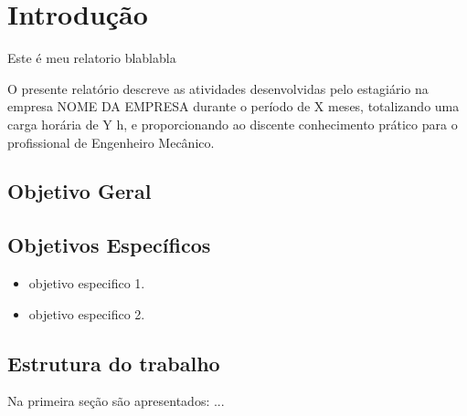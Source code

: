 \chapter{Introdução}\label{ch:introducao}

Este é meu relatorio blablabla 

O presente relatório descreve as atividades desenvolvidas pelo estagiário na empresa 
NOME DA EMPRESA durante o período de X meses, totalizando uma carga horária de Y h, 
e proporcionando ao discente conhecimento prático para o profissional de Engenheiro Mecânico.

\section{Objetivo Geral}\label{sec:objetivogeral}


\section{Objetivos Específicos}\label{sec:objetivoesp}

	\begin{itemize}
		\item objetivo especifico 1.
		\item objetivo especifico 2.
	\end{itemize}

\section{Estrutura do trabalho}\label{sec:estruturatrab}

Na primeira seção são apresentados: ...
